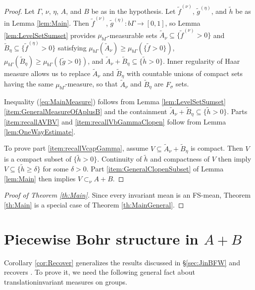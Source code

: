\documentclass[12pt]{amsart} \usepackage{amsmath,centernot,amssymb,leftindex}
\numberwithin{theorem}{section}
\numberwithin{equation}{section}
\theoremstyle{definition}
\begin{document}
\begin{proof}
	Let $\Gamma$, $\nu$, $\eta$, $A$, and $B$ be as in the hypothesis. Let $\tilde{f}^{(\nu)}$, $\tilde{g}^{(\eta)}$, and $\tilde{h}$ be as in Lemma \ref{lem:Main}. Then $\tilde{f}^{(\nu)}$, $ \tilde{g}^{(\eta)}:b\Gamma\to [0,1]$, so Lemma \ref{lem:LevelSetSumset} provides $\mu_{b\Gamma}$-measurable sets $\tilde{A}_{\nu}\subseteq \{\tilde{f}^{(\nu)}>0\}$ and $\tilde{B}_{\eta}\subseteq \{\tilde{f}^{(\eta)}>0\}$ satisfying $\mu_{b\Gamma}(\tilde{A}_{\nu})\geq \mu_{b\Gamma}(\{\tilde{f}>0\})$, $\mu_{b\Gamma}(\tilde{B}_{\eta})\geq \mu_{b\Gamma}(\{\tilde{g}>0\})$, and $\tilde{A}_{\nu}+\tilde{B}_{\eta}\subseteq \{\tilde{h}>0\}$.   Inner regularity of Haar measure allows us to replace $\tilde{A}_{\nu}$ and $\tilde{B}_{\eta}$ with countable unions of compact sets having the same $\mu_{b\Gamma}$-measure, so that $\tilde{A}_{\nu}$ and $\tilde{B}_{\eta}$ are $F_{\sigma}$ sets.
	
	Inequality (\ref{eq:MainMeasure}) follows from Lemma \ref{lem:LevelSetSumset} \ref{item:GeneralMeasureOfAplusB} and the containment $\tilde{A}_{\nu}+\tilde{B}_{\eta}\subseteq \{\tilde{h}>0\}$. 	Parts \ref{item:recallAVBV} and \ref{item:recallVbGammaClopen} follow from Lemma \ref{lem:OneWayEstimate}.
		
	To prove part \ref{item:recallVcapGamma}, assume $V\subseteq \tilde{A}_{\nu}+\tilde{B}_{\eta}$ is compact. Then $V$ is a compact subset of  $\{\tilde{h}>0\}$. Continuity of $\tilde{h}$ and compactness of $V$ then imply $V\subseteq \{\tilde{h}\geq \delta\}$ for some $\delta>0$.  Part \ref{item:GeneralClopenSubset} of Lemma \ref{lem:Main} then implies $V\subset_{\nu} A+B$. \end{proof}



\begin{proof}[Proof of Theorem \ref{th:Main}]
	Since every invariant mean is an FS-mean, Theorem \ref{th:Main} is a special case of Theorem \ref{th:MainGeneral}.
\end{proof}


	
	
	
	
	
	\section{Piecewise Bohr structure in \texorpdfstring{$A+B$}{A+B}}  

	
	Corollary \ref{cor:Recover} generalizes the results discussed in \S\ref{sec:JinBFW} and recovers \cite[Theorem 1.4]{Griesmer_SumsetsDenseSparse}.  To prove it, we need the following general fact about translation\text{-}invariant measures on groups.
	
\end{document}
